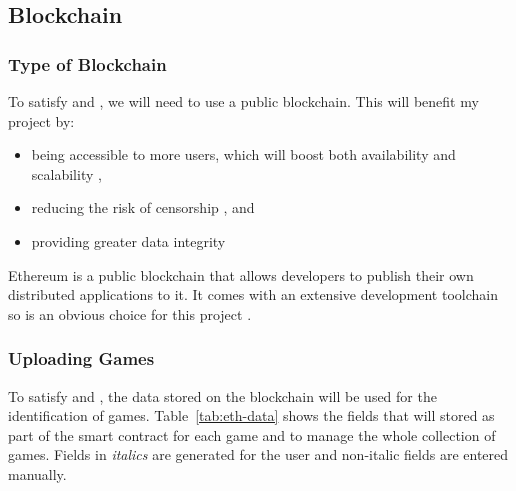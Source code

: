 
\subsection*{Blockchain}\label{subsec:design-con-eth}

\subsubsection*{Type of Blockchain}

To satisfy  and , we will need to use a public blockchain. This will benefit my project by:
\vspace{2mm}
\begin{itemize}
  \item being accessible to more users, which will boost both availability and scalability ,
  \item reducing the risk of censorship , and
  \item providing greater data integrity 
\end{itemize}

\newparagraph Ethereum is a public blockchain that allows developers to publish their own distributed applications to it. It comes with an extensive development toolchain so is an obvious choice for this project .

\subsubsection*{Uploading Games}
\label{subsubsec:eth-data}

To satisfy  and , the data stored on the blockchain will be used for the identification of games. Table~\ref{tab:eth-data} shows the fields that will stored as part of the smart contract for each game and to manage the whole collection of games. Fields in \textit{italics} are generated for the user and non-italic fields are entered manually.

